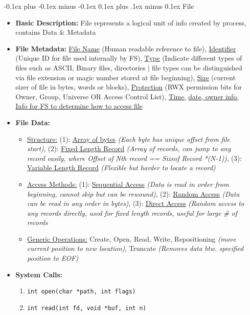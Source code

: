 \documentclass[landscape]{article}
\makeatletter
\renewcommand{\subsection}{\@startsection{subsection}{2}{0mm}%
  {-0.1ex plus -0.1ex minus -0.1ex}%
  {0.1ex plus .1ex minus 0.1ex}%
{\normalfont\scriptsize\bfseries}}
\makeatother
\begin{document}
\begin{multicols*}{6}
    \subsection{File}
    \begin{itemize}
      \item \textbf{Basic Description:} File represents a logical unit of info created by process, contains Data \& Metadata
      \item \textbf{File Metadata:} \underline{File Name} (Human readable reference to file), \underline{Identifier} (Unique ID for file used internally by FS), \underline{Type} (Indicate different types of files such as ASCII, Binary files, directories $\vert$ file types can be distinguished via file extension or magic number stored at file beginning), \underline{Size} (current sizer of file in bytes, words or blocks), \underline{Protection} (RWX permission bits for Owner, Group, Universe OR Access Control List), \underline{Time,} \underline{ date, owner info, Info for FS to determine how to access file}
      \item \textbf{File Data:}
      \begin{itemize}
        \item \underline{Structure:} (1): \underline{Array of bytes} \textit{(Each byte has unique offset from file start)}, (2): \underline{Fixed Length Record} \textit{(Array of records, can jump to any record easily, where Offset of Nth record == Sizeof Record *(N-1))}, (3): \underline{Variable Length Record} \textit{(Flexible but harder to locate a record)}
        \item \underline{Access Methods:} (1): \underline{Sequential Access} \textit{(Data is read in order from beginning, cannot skip but can be rewound)}, (2): \underline{Random Access} \textit{(Data can be read in any order in bytes)}, (3): \underline{Direct Access} \textit{(Random access to any records directly, used for fixed length records, useful for large \# of records}
        \item \underline{Generic Operations:} Create, Open, Read, Write, Repositioning \textit{(move current position to new location)}, Truncate \textit{(Removes data btw. specified position to EOF)}
      \end{itemize}
      \item \textbf{System Calls:}
      \begin{enumerate}
        \item \verb|int open(char *path, int flags)|
        \item \verb|int read(int fd, void *buf, int n)|

\end{enumerate}
\end{itemize}
\end{multicols*}
\end{document}
